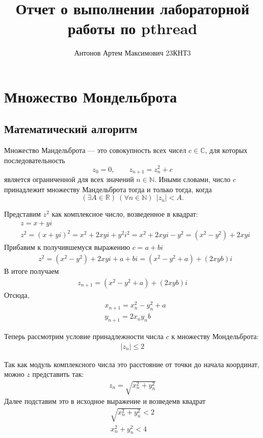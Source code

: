 \documentclass[12pt,a4paper]{article}
\title{Отчет о выполнении лабораторной работы по pthread}
\author{Антонов Артем Максимович 23КНТ3}
\begin{document}
\maketitle

\section{Множество Мондельброта}


\subsection{Математический алгоритм}

Множество Мандельброта --- это совокупность всех чисел $c \in \mathbb{C}$, для которых последовательность
\begin{equation}
  z_0 = 0, \qquad z_{n+1} = z_n^2 + c
  \label{eq:mandelbrot}
\end{equation}
является ограниченной для всех значений $n \in \mathbb{N}$. Иными словами, число $c$ принадлежит множеству Мандельброта тогда и только тогда, когда
\begin{equation}
  (\exists A \in \mathbb{R})\ (\forall n \in \mathbb{N})\ \ |z_n| < A.
\end{equation}

Представим $z^2$ как комплексное число, возведенное в квадрат:
\begin{align}
  &z = x + yi \\
  &z^2 = (x + yi)^2 = x^2 + 2xyi + y^2i^2 = x^2 + 2xyi - y^2 = (x^2 - y^2) + 2xyi
\end{align}
Прибавим к получившемуся выражению $c = a + bi$
\begin{align}
  &z^2 = (x^2 - y^2) + 2xyi + a + bi = (x^2 - y^2 + a) + (2xyb)i
\end{align}
В итоге получаем
\begin{align}
  z_{n+1} = (x^2 - y^2 + a) + (2xyb)i
\end{align}
Отсюда, 
\begin{align}
  &x_{n+1} = x_n^2 - y_n^2 + a \\
  &y_{n+1} = 2x_ny_nb
\end{align}

Теперь рассмотрим условие принадлежности числа $c$ к множеству Мондельброта:
\begin{align}
  |z_n| \le  2
\end{align}

Так как модуль комплексного числа это расстояние от точки до начала координат, можно $z$ представить так:
\begin{align}
  z_n = \sqrt {x_n^2 + y_n^2}
\end{align}
Далее подставим это в исходное выражение и возведемв квадрат
\begin{align}
  \sqrt {x_n^2 + y_n^2} < 2 \\
  x_n^2 + y_n^2 < 4
\end{align}
\end{document}
